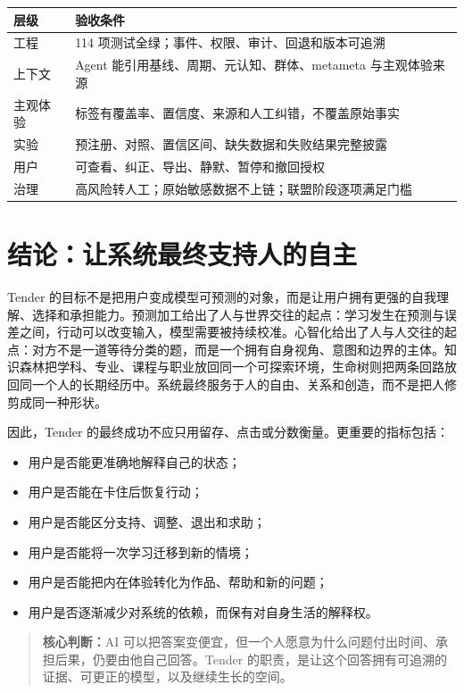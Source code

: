 \documentclass[UTF8,a4paper,11pt]{ctexart}
\newcommand{\keypoint}[1]{\begin{quote}\noindent\textbf{\color{TenderBlue}核心判断：}#1\end{quote}}
\begin{document}
\begin{center}
\begin{longtable}{@{}p{4.3cm}p{8.5cm}@{}}
\toprule
\textbf{层级} & \textbf{验收条件} \\
\midrule
工程 & 114 项测试全绿；事件、权限、审计、回退和版本可追溯 \\
上下文 & Agent 能引用基线、周期、元认知、群体、metameta 与主观体验来源 \\
主观体验 & 标签有覆盖率、置信度、来源和人工纠错，不覆盖原始事实 \\
实验 & 预注册、对照、置信区间、缺失数据和失败结果完整披露 \\
用户 & 可查看、纠正、导出、静默、暂停和撤回授权 \\
治理 & 高风险转人工；原始敏感数据不上链；联盟阶段逐项满足门槛 \\
\bottomrule
\end{longtable}
\end{center}

\newpage
\section{结论：让系统最终支持人的自主}

Tender 的目标不是把用户变成模型可预测的对象，而是让用户拥有更强的自我理解、选择和承担能力。预测加工给出了人与世界交往的起点：学习发生在预测与误差之间，行动可以改变输入，模型需要被持续校准。心智化给出了人与人交往的起点：对方不是一道等待分类的题，而是一个拥有自身视角、意图和边界的主体。知识森林把学科、专业、课程与职业放回同一个可探索环境，生命树则把两条回路放回同一个人的长期经历中。系统最终服务于人的自由、关系和创造，而不是把人修剪成同一种形状。

因此，Tender 的最终成功不应只用留存、点击或分数衡量。更重要的指标包括：

\begin{itemize}
\item 用户是否能更准确地解释自己的状态；
\item 用户是否能在卡住后恢复行动；
\item 用户是否能区分支持、调整、退出和求助；
\item 用户是否能将一次学习迁移到新的情境；
\item 用户是否能把内在体验转化为作品、帮助和新的问题；
\item 用户是否逐渐减少对系统的依赖，而保有对自身生活的解释权。
\end{itemize}

\keypoint{AI 可以把答案变便宜，但一个人愿意为什么问题付出时间、承担后果，仍要由他自己回答。Tender 的职责，是让这个回答拥有可追溯的证据、可更正的模型，以及继续生长的空间。}
\end{document}

